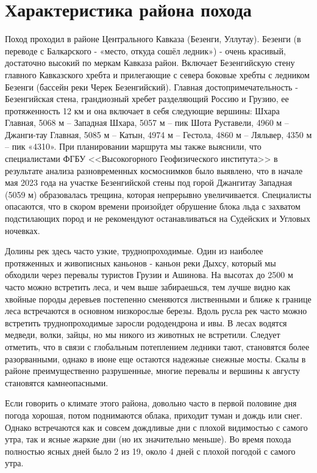 \section{Характеристика района похода}\label{sec:characteristics_of_area}

Поход проходил в районе Центрального Кавказа (Безенги, Уллутау).
Безенги (в переводе с Балкарского - «место, откуда сошёл ледник») - очень красивый, достаточно высокий по меркам Кавказа район. Включает Безенгийскую стену главного Кавказского хребта и прилегающие с севера боковые хребты с ледником Безенги (бассейн реки Черек Безенгийский). Главная достопримечательность - Безенгийская стена, грандиозный хребет разделяющий Россию и Грузию, ее протяженность 12 км и она включает в себя следующие вершины: Шхара Главная, 5068 м -- Западная Шхара, 5057 м -- пик Шота Руставели, 4960 м -- Джанги-тау Главная, 5085 м -- Катын, 4974 м -- Гестола, 4860 м -- Ляльвер, 4350 м -- пик «4310». При планировании маршрута мы также выяснили, что специалистами ФГБУ <<Высокогорного Геофизического института>> в результате анализа разновременных космоснимков было выявлено, что в начале мая 2023 года на участке Безенгийской стены под горой Джангитау Западная (5059 м) образовалась трещина, которая непрерывно увеличивается. Специалисты опасаются, что в скором времени произойдет обрушение блока льда с захватом подстилающих пород и не рекомендуют останавливаться на Судейских и Угловых ночевках.

Долины рек здесь часто узкие, труднопроходимые. Один из наиболее протяженных и живописных каньонов - каньон реки Дыхсу, который мы обходили через перевалы туристов Грузии и Ашинова. На высотах до 2500 м часто можно встретить леса, и чем выше забираешься, тем лучше видно как хвойные породы деревьев постепенно сменяются лиственными и ближе к границе леса встречаются в основном низкорослые березы. Вдоль русла рек часто можно встретить труднопроходимые заросли рододендрона и ивы. В лесах водятся медведи, волки, зайцы, но мы никого из животных не встретили. Следует отметить, что в связи с глобальным потеплением ледники тают, становятся более разорванными, однако в июне еще остаются надежные снежные мосты. Скалы в районе преимущественно разрушенные, многие перевалы и вершины к августу становятся камнеопасными. 

Если говорить о климате этого района, довольно часто в первой половине дня погода хорошая, потом поднимаются облака, приходит туман и дождь или снег. Однако встречаются как и совсем дождливые дни с плохой видимостью с самого утра, так и ясные жаркие дни (но их значительно меньше). Во время похода полностью ясных дней было 2 из 19, около 4 дней с плохой погодой с самого утра.

